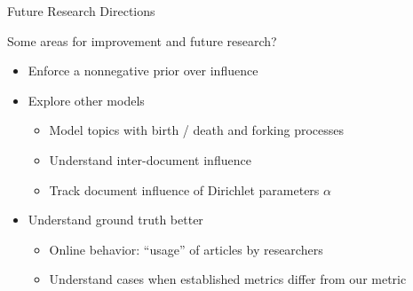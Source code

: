 \documentclass[final,t]{beamer}
\begin{document}
\begin{frame}{}
\begin{columns}[t]
\begin{column}{.32\linewidth}
\begin{block}{Future Research Directions}
\hspace{-1.8cm} \parbox{.93\textwidth}{
Some areas for improvement and future research?

  \begin{itemize}
    \item Enforce a nonnegative prior over influence
    \item Explore other models
    \begin{itemize}
       \item Model topics with birth / death and forking processes
       \item Understand inter-document influence
       \item Track document influence of Dirichlet parameters $\alpha$
    \end{itemize} 
    \item Understand ground truth better
    \begin{itemize}
      \item Online behavior: ``usage'' of articles by researchers
      \item Understand cases when established metrics differ from our metric
   \end{itemize}
  \end{itemize}
}
\end{block}


    \end{column}
 \end{columns}

\end{frame}
\end{document}
